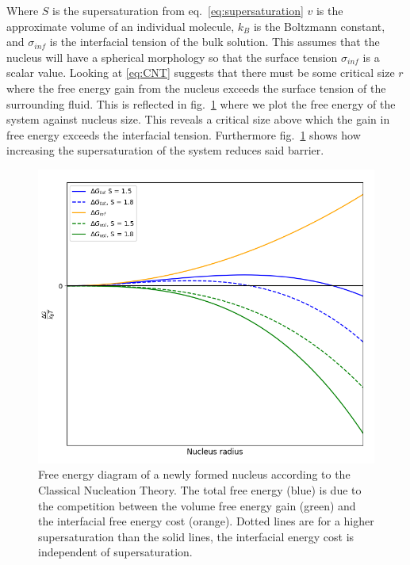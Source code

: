Where $S$ is the supersaturation from eq.~\eqref{eq:supersaturation} 
$v$ is the approximate volume of an individual molecule, 
$k_B$ is the Boltzmann constant, and $\sigma_{inf}$ is the 
interfacial tension of the bulk solution. This assumes that 
the nucleus will have a spherical morphology so that the 
surface tension $\sigma_{inf}$ is a scalar value. Looking at 
\eqref{eq:CNT} suggests that there must be some critical size 
$r$ where the free energy gain from the nucleus exceeds the 
surface tension of the surrounding fluid. This is reflected in 
fig.~\ref{fig:free_energy} where we plot the free energy of the 
system against nucleus size. This reveals a critical size above 
which the gain in free energy exceeds the interfacial tension. 
Furthermore fig.~\ref{fig:free_energy} shows how increasing the 
supersaturation of the system reduces said barrier. 
\begin{figure}[h!]
	\centering
	\includegraphics[width=\linewidth]{Free_Energy_Diagram.png}
	\caption{Free energy diagram of a newly formed nucleus according 
		     to the Classical Nucleation Theory. The total free energy (blue)
		     is due to the competition between the volume free energy gain
		     (green) and the interfacial free energy cost (orange). Dotted
		     lines are for a higher supersaturation than the solid lines,
		     the interfacial energy cost is independent of supersaturation.}
	\label{fig:free_energy}
\end{figure}

